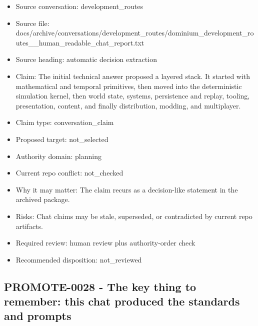 \documentclass[11pt,a4paper]{report}
\begin{document}
\begin{itemize}
\item Source conversation: development\_routes
\item Source file: docs/archive/conversations/development\_routes/dominium\_development\_routes\_\_human\_readable\_chat\_report.txt
\item Source heading: automatic decision extraction
\item Claim: The initial technical answer proposed a layered stack. It started with mathematical and temporal primitives, then moved into the deterministic simulation kernel, then world state, systems, persistence and replay, tooling, presentation, content, and finally distribution, modding, and multiplayer.
\item Claim type: conversation\_claim
\item Proposed target: not\_selected
\item Authority domain: planning
\item Current repo conflict: not\_checked
\item Why it may matter: The claim recurs as a decision-like statement in the archived package.
\item Risks: Chat claims may be stale, superseded, or contradicted by current repo artifacts.
\item Required review: human review plus authority-order check
\item Recommended disposition: not\_reviewed
\end{itemize}

\subsection{PROMOTE-0028 - The key thing to remember: this chat produced the standards and prompts}
\end{document}
